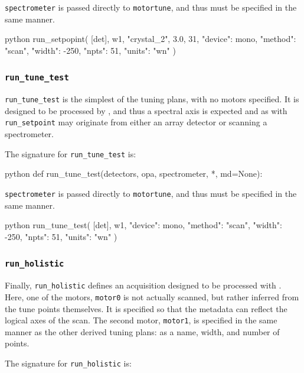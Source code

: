 \texttt{spectrometer} is passed directly to \texttt{motortune}, and thus must be specified in the same manner.

\begin{codefragment}{python}
run_setpopint(
    [det],
    w1,
    "crystal_2",
    3.0,
    31,
    {"device": mono, "method": "scan", "width": -250, "npts": 51, "units": "wn"}
)
\end{codefragment}

\subsubsection{\texttt{run\_tune\_test}}

\texttt{run\_tune\_test} is the simplest of the tuning plans, with no motors specified.
It is designed to be processed by , and thus a spectral axis is expected and as with \texttt{run\_setpoint} may originate from either an array detector or scanning a spectrometer.

The signature for \texttt{run\_tune\_test} is:

\begin{codefragment}{python}
def run_tune_test(detectors, opa, spectrometer, *, md=None):
\end{codefragment}

\texttt{spectrometer} is passed directly to \texttt{motortune}, and thus must be specified in the same manner.

\begin{codefragment}{python}
run_tune_test(
    [det],
    w1,
    {"device": mono, "method": "scan", "width": -250, "npts": 51, "units": "wn"}
)
\end{codefragment}

\subsubsection{\texttt{run\_holistic}}

Finally, \texttt{run\_holistic} defines an acquisition designed to be processed with .
Here, one of the motors, \texttt{motor0} is not actually scanned, but rather inferred from the tune points themselves.
It is specified so that the metadata can reflect the logical axes of the scan.
The second motor, \texttt{motor1}, is specified in the same manner as the other derived tuning plans: as a name, width, and number of points.

The signature for \texttt{run\_holistic} is:

